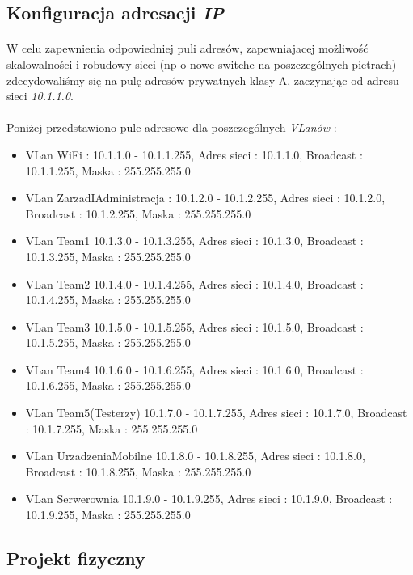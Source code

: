 \subsection{Konfiguracja adresacji \textit{IP}}
\paragraph{}
W celu zapewnienia odpowiedniej puli adresów, zapewniajacej możliwość skalowalności i robudowy sieci (np o nowe switche na poszczególnych pietrach) zdecydowaliśmy się na pulę adresów prywatnych klasy A, zaczynając od adresu sieci \textit{10.1.1.0}.
\paragraph{}
Poniżej przedstawiono pule adresowe dla poszczególnych \textit{VLanów} :
\begin{itemize}
	\item VLan WiFi : 10.1.1.0 - 10.1.1.255, Adres sieci : 10.1.1.0, Broadcast : 10.1.1.255, Maska : 255.255.255.0
	\item VLan ZarzadIAdministracja : 10.1.2.0 - 10.1.2.255, Adres sieci : 10.1.2.0, Broadcast : 10.1.2.255, Maska : 255.255.255.0
	\item VLan Team1 10.1.3.0 - 10.1.3.255, Adres sieci : 10.1.3.0, Broadcast : 10.1.3.255, Maska : 255.255.255.0
	\item VLan Team2 10.1.4.0 - 10.1.4.255, Adres sieci : 10.1.4.0, Broadcast : 10.1.4.255, Maska : 255.255.255.0
	\item VLan Team3 10.1.5.0 - 10.1.5.255, Adres sieci : 10.1.5.0, Broadcast : 10.1.5.255, Maska : 255.255.255.0
	\item VLan Team4 10.1.6.0 - 10.1.6.255, Adres sieci : 10.1.6.0, Broadcast : 10.1.6.255, Maska : 255.255.255.0
	\item VLan Team5(Testerzy) 10.1.7.0 - 10.1.7.255, Adres sieci : 10.1.7.0, Broadcast : 10.1.7.255, Maska : 255.255.255.0
	\item VLan UrzadzeniaMobilne 10.1.8.0 - 10.1.8.255, Adres sieci : 10.1.8.0, Broadcast : 10.1.8.255, Maska : 255.255.255.0
	\item VLan Serwerownia 10.1.9.0 - 10.1.9.255, Adres sieci : 10.1.9.0, Broadcast : 10.1.9.255, Maska : 255.255.255.0
\end{itemize}


\subsection{Projekt fizyczny}
